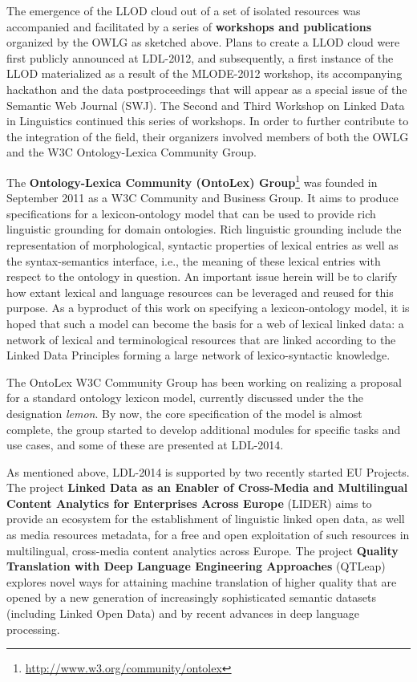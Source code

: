 The emergence of the LLOD cloud out of a set of isolated resources was accompanied and facilitated by a series of \textbf{workshops and publications} organized by the OWLG as sketched above. 
Plans to create a LLOD cloud were first publicly announced at LDL-2012, and subsequently, a first instance of the LLOD materialized as a result of the MLODE-2012 workshop, its accompanying hackathon and the data postproceedings that will appear as a special issue of the Semantic Web Journal (SWJ). 
The Second and Third Workshop on Linked Data in Linguistics continued this series of workshops.
In order to further contribute to the integration of the field, their organizers involved members of both the OWLG and the W3C Ontology-Lexica Community Group.

The \textbf{Ontology-Lexica Community (OntoLex) Group}\footnote{\url{http://www.w3.org/community/ontolex}} was founded  in September 2011 as a W3C Community and Business Group. It aims to produce specifications for a lexicon-ontology model that can be used to provide rich linguistic grounding for domain ontologies.
Rich linguistic grounding include the representation of morphological, syntactic properties of lexical entries as well as the syntax-semantics interface, i.e., the meaning of these lexical entries with respect to the ontology in question. An important issue herein will be to clarify how extant lexical and language resources can be leveraged and reused for this purpose. As a byproduct of this work on specifying a lexicon-ontology model, it is hoped that such a model can become the basis for a web of lexical linked data: a network of lexical and terminological resources that are linked according to the Linked Data Principles forming a large network of lexico-syntactic knowledge.

The OntoLex W3C Community Group has been working on realizing a proposal for a standard ontology lexicon model, currently discussed under the the designation \emph{lemon}. By now, the core specification of the model is almost complete, the group started to develop additional modules for specific tasks and use cases, and some of these are presented at LDL-2014.

As mentioned above, LDL-2014 is supported by two recently started EU Projects.
The project \textbf{Linked Data as an Enabler of Cross-Media and Multilingual Content Analytics for Enterprises Across Europe} (LIDER) aims to provide an 
ecosystem for the establishment of linguistic linked open data, as well as media resources metadata, for a free and open exploitation of such resources in 
multilingual, cross-media content analytics across Europe. 
The project \textbf{Quality Translation with Deep Language Engineering Approaches} (QTLeap) explores novel ways for attaining machine translation of higher quality that are opened by a new generation of increasingly sophisticated semantic datasets (including Linked Open Data) and by recent advances in deep language processing.

